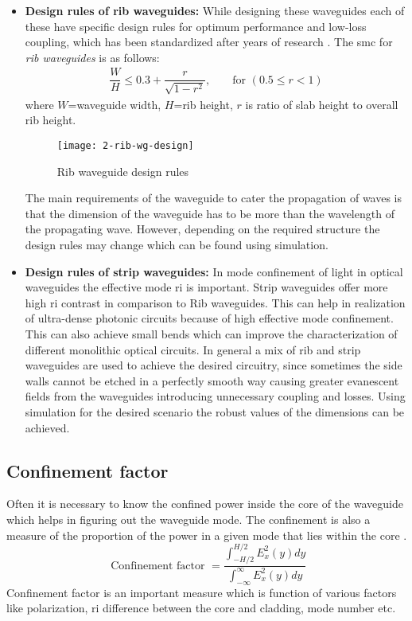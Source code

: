 \documentclass[../report.tex]{subfiles}
\begin{document}
\begin{itemize}	
	\item \textbf{Design rules of rib waveguides:} While designing these waveguides each of these have specific design rules for optimum performance and low-loss coupling, which has been standardized after years of research \cite{reed_silicon_2008}. The \gls{smc} for \textit{rib waveguides} is as follows:	
	\begin{equation}\label{eq:smc_rib_wg}
	\begin{aligned}
	\dfrac {W} {H}\leq 0.3+\dfrac {r} {\sqrt {1-r^{2}}},  && \text{ for } (0.5 \leq r < 1)
	\end{aligned}
	\end{equation}
	where $W$=waveguide width, $H$=rib height, $r$ is ratio of slab height to overall rib height.
	\begin{figure}[H] %
		\centering
		\texttt{[image: 2-rib-wg-design]}
		\caption{Rib waveguide design rules}
		\label{fig:2_rib_wg_design}
	\end{figure}
	The main requirements of the waveguide to cater the propagation of waves is that the dimension of the waveguide has to be more than the wavelength of the propagating wave. However, depending on the required structure the design rules may change which can be found using simulation. 
	
	\item \textbf{Design rules of strip waveguides:} In mode confinement of light in optical waveguides the effective mode \gls{ri} is important. Strip waveguides offer more high \gls{ri} contrast in comparison to Rib waveguides. This can help in realization of ultra-dense photonic circuits because of high effective mode confinement. This can also achieve small bends which can improve the characterization of different monolithic optical circuits. In general a mix of rib and strip waveguides are used to achieve the desired circuitry, since sometimes the side walls cannot be etched in a perfectly smooth way causing greater evanescent fields from the waveguides introducing unnecessary coupling and losses. Using simulation for the desired scenario the robust values of the dimensions can be achieved.
\end{itemize}
	
		\subsection{Confinement factor}
Often it is necessary to know the confined power inside the core of the waveguide which helps in figuring out the waveguide mode. The confinement is also a measure of the proportion of the power in a given mode that lies within the core \cite{reed_silicon_2008}.  
\begin{equation}\label{eq:per}
\text{ Confinement factor } = \dfrac {\int _{-H / 2}^{H/2}E_{x}^{2}\left( y\right) dy} {\int _{-\infty }^{\infty }E_{x}^{2}\left( y\right) dy}
\end{equation}
Confinement factor is an important measure which is function of various factors like polarization, \gls{ri} difference between the core and cladding, mode number etc.	
		
\end{document}
